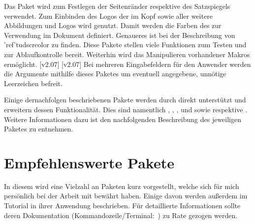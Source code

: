 \begin{DeclarePackages}
  Das Paket wird zum Festlegen der Seitenränder respektive des Satzspiegels 
  verwendet.
  Zum Einbinden des Logos der \TnUD im Kopf sowie aller weitere Abbildungen und 
  Logos wird  genutzt.
  Damit werden die Farben des \CDs zur Verwendung im Dokument definiert. 
  Genaueres ist bei der Beschreibung von \Package'ref'{tudscrcolor} zu finden. 
  Diese Pakete stellen viele Funktionen zum Testen und zur Ablaufkontrolle 
  bereit. Weiterhin wird das Manipulieren vorhandener Makros ermöglicht.
  [v2.07]
  [v2.07]
  Bei mehreren Eingabefeldern für den Anwender werden die Argumente mithilfe 
  dieses Paketes um eventuell angegebene, unnötige Leerzeichen befreit.
\end{DeclarePackages}

Einige dernachfolgen beschriebenen Pakete werden durch \TUDScript direkt 
unterstützt und erweitern dessen Funktionalität. Dies sind namentlich 
, , ,  
und  sowie  respektive . 
Weitere Informationen dazu ist den nachfolgenden Beschreibung des jeweiligen 
Paketes zu entnehmen.



\section{%
  Empfehlenswerte Pakete%
  \label{sec:packages:recommended}%
}
%
In diesem \autorefname wird eine Vielzahl an Paketen kurz vorgestellt, welche 
sich für mich persönlich bei der Arbeit mit  bewährt haben. 
Einige davon werden außerdem im Tutorial  in ihrer Anwendung 
beschrieben. Für detaillierte Informationen sollte deren Dokumentation
(Kommandozeile/Terminal:~) zu Rate gezogen 
werden.



